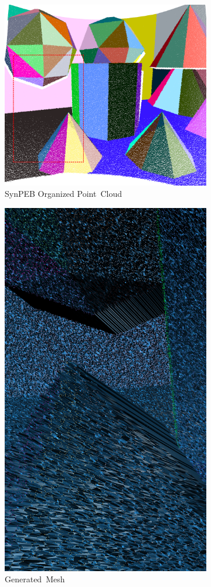 \begin{figure}[H]

  \begin{subfigure}[t]{.45\linewidth}
    \centering\includegraphics[width=.5\linewidth]{chapter_3_polylidar3d/imgs/synpeb_var4_pcd_cropped_outline.png}
    \caption{\label{fig:ch3_synpeb_a}SynPEB Organized Point~Cloud}
  \end{subfigure}
  \hfill
  \begin{subfigure}[t]{.23\linewidth}
    \centering\includegraphics[width=.5\linewidth]{chapter_3_polylidar3d/imgs/synpeb_var4_mesh_cropped.png}
    \caption{\label{fig:ch3_synpeb_b}Generated~Mesh}
  \end{subfigure}
  \begin{subfigure}[t]{.23\linewidth}

\end{subfigure}
\end{figure}
